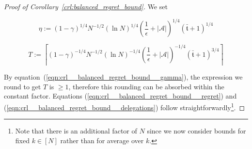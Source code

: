 \documentclass[anon,12pt]{colt2018} %
\newcommand{\AP}[1]{\left(#1\right)}
\newcommand{\Abs}[1]{\left\vert #1 \right\vert}
\newcommand{\Ceil}[1]{\left\lceil #1 \right\rceil}
\newcommand{\A}{\mathcal{A}}
\newcommand{\Tn}{\mathfrak{t}}
\begin{document}
\begin{proof}[Proof of Corollary~\ref{crl:balanced_regret_bound}]

We set 

$$\eta:=(1-\gamma)^{1/4} N^{-1/2} \AP{\ln N}^{1/4} \AP{\frac{1}{\epsilon}+\Abs{\A}}^{1/4} \AP{\bar{\Tn}+1}^{1/4}$$  

$$T:=\Ceil{(1-\gamma)^{-1/4}N^{-1/2} \AP{\ln N}^{-1/4} \AP{\frac{1}{\epsilon}+\Abs{\A}}^{-1/4} \AP{\bar{\Tn}+1}^{3/4}}$$

By equation~(\ref{eqn:crl__balanced_regret_bound__gamma}), the expression we round to get $T$ is $\geq 1$, therefore this rounding can be absorbed within the constant factor. Equations (\ref{eqn:crl__balanced_regret_bound__regret}) and (\ref{eqn:crl__balanced_regret_bound__delegations}) follow straightforwardly\footnote{Note that there is an additional factor of $N$ since we now consider bounds for fixed $k\in[N]$ rather than for average over $k$.}.
\end{proof}
\end{document}
